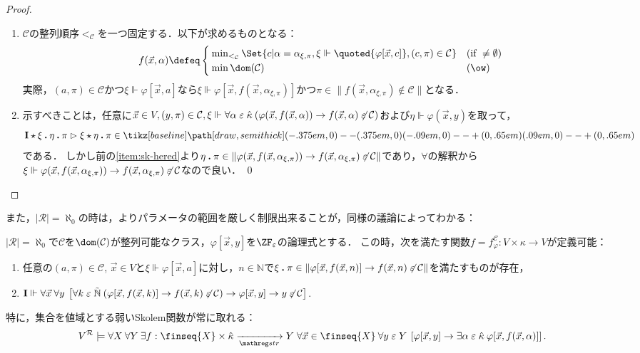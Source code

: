 \documentclass[realisability.tex]{subfiles}
\begin{document}
\begin{proof}
 \begin{enumerate}
  \item $\mathcal{C}$の整列順序${<_{\mathcal{C}}}$を一つ固定する．以下が求めるものとなる：
        \[
         f(\vec{x}, \alpha) \defeq
         \begin{cases}
          \min_{<_{\mathcal{C}}} \Set{c | \alpha = \alpha_{\xi, \pi}, \xi \Vdash \quoted{\varphi[\vec{x}, c]}, (c, \pi) \in \mathcal{C}} & (\text{if } \neq \emptyset)\\
          \min \dom(\mathcal{C}) & (\ow)
         \end{cases}
        \]
        実際，$(a, \pi) \in \mathcal{C}$かつ$\xi \Vdash \varphi[\vec{x}, a]$なら$\xi \Vdash \varphi[\vec{x}, f(\vec{x}, \alpha_{\xi,\pi})]$かつ$\pi \in \|f(\vec{x}, \alpha_{\xi,\pi}) \notin \mathcal{C}\|$となる．
  \item 示すべきことは，任意に$\vec{x} \in V, (y, \pi) \in \mathcal{C}, \xi \Vdash \forall \alpha \mathrel{\varepsilon} \hat{\kappa} \:(\varphi(\vec{x}, f(\vec{x}, \alpha)) \to f(\vec{x}, \alpha) \not\mathrel{\varepsilon} \mathcal{C})$および$\eta \Vdash \varphi(\vec{x}, y)$を取って，
        \[
         \KVM{{\I}{\xi}{\eta}{\pi}} \redsto \KVM{{\xi}{\eta}{\pi}} \in \pole
        \]
        である．
        しかし前の\ref{item:sk-hered}より$\eta \mathbin{\boldsymbol{.}} \pi \in \|\varphi(\vec{x}, f(\vec{x}, \alpha_{\xi,\pi})) \to f(\vec{x}, \alpha_{\xi,\pi}) \not\mathrel{\varepsilon} \mathcal{C}\|$であり，$\forall$の解釈から$\xi \Vdash \varphi(\vec{x}, f(\vec{x}, \alpha_{\xi,\pi})) \to f(\vec{x}, \alpha_{\xi,\pi}) \not\mathrel{\varepsilon} \mathcal{C}$なので良い． \qed
 \end{enumerate}
\end{proof}
また，$|\mathcal{R}| = \aleph_0$の時は，よりパラメータの範囲を厳しく制限出来ることが，同様の議論によってわかる：
\begin{lemma}\label{lem:weak-skolem-ctbl}
 $|\mathcal{R}| = \aleph_0$で$\mathcal{C}$を$\dom(\mathcal{C})$が整列可能なクラス，$\varphi[\vec{x}, y]$を$\ZF_{\varepsilon}$の論理式とする．
 この時，次を満たす関数$f = f^{\mathcal{C}}_{\varphi}: V \times \kappa \to V$が定義可能：
 \begin{enumerate}
  \item \label{item:sk-hered}任意の$(a, \pi) \in \mathcal{C}$, $\vec{x} \in V$と$\xi \Vdash \varphi[\vec{x}, a]$に対し，$n \in \mathbb{N}$で$\xi \mathbin{\boldsymbol{.}} \pi \in \|\varphi[\vec{x}, f(\vec{x}, n)] \to f(\vec{x}, n) \not\mathrel{\varepsilon} \mathcal{C}\|$を満たすものが存在，
  \item $\mathsf{\mathbf{I}} \Vdash \forall \vec{x} \: \forall y \:\left[ \forall k \mathrel{\varepsilon} \mathord{\tilde{\mathbb{N}}}\: (\varphi[\vec{x}, f(\vec{x}, k)] \to f(\vec{x},k) \not\mathrel{\varepsilon} \mathcal{C}) \to \varphi[\vec{x}, y] \to y \not\mathrel{\varepsilon} \mathcal{C} \right]$. 
 \end{enumerate}
 特に，集合を値域とする弱いSkolem関数が常に取れる：
 \[
 V^{\mathcal{R}} \models \forall X\: \forall Y \: \exists f: \finseq{X} \times \hat{\kappa} \strto Y\; \forall \vec{x} \in \finseq{X} \:\forall y \strin Y \: 
  \left[\varphi[\vec{x}, y] \to \exists \alpha \strin \hat{\kappa} \: \varphi[\vec{x}, f(\vec{x}, \alpha)]\right].
 \]
\end{lemma}
\end{document}
